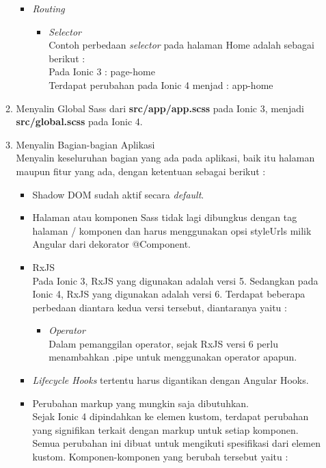\begin{enumerate}
\begin{enumerate}
\begin{itemize}
			\item {\it Routing}
			\begin{itemize}
				\item {\it Selector} \\
				Contoh perbedaan {\it selector} pada halaman Home adalah sebagai berikut :\\
				Pada Ionic 3 : page-home  \\
				Terdapat perubahan pada Ionic 4 menjad : app-home
			\end{itemize}

			
		\end{itemize}
		

		\item Menyalin Global Sass dari \textbf{src/app/app.scss} pada Ionic 3, menjadi \textbf{src/global.scss} pada Ionic 4.

		\item Menyalin Bagian-bagian Aplikasi \\
		Menyalin keseluruhan bagian yang ada pada aplikasi, baik itu halaman maupun fitur yang ada, dengan ketentuan sebagai berikut :

		\begin{itemize}
			\item Shadow DOM sudah aktif secara {\it default}.
			\item Halaman atau komponen Sass tidak lagi dibungkus dengan tag halaman / komponen dan harus menggunakan opsi styleUrls milik Angular dari dekorator @Component.
			\item RxJS \\
			Pada Ionic 3, RxJS yang digunakan adalah versi 5. Sedangkan pada Ionic 4, RxJS yang digunakan adalah versi 6. Terdapat beberapa perbedaan diantara kedua versi tersebut, diantaranya yaitu :
			\begin{itemize}
				\item {\it Operator} \\
				Dalam pemanggilan operator, sejak RxJS versi 6 perlu menambahkan .pipe untuk menggunakan operator apapun.
			\end{itemize}


			\item {\it Lifecycle Hooks} tertentu harus digantikan dengan Angular Hooks.
			\item Perubahan markup yang mungkin saja dibutuhkan. \\
			Sejak Ionic 4 dipindahkan ke elemen kustom, terdapat perubahan yang signifikan terkait dengan markup untuk setiap komponen. Semua perubahan ini dibuat untuk mengikuti spesifikasi dari elemen kustom. Komponen-komponen yang berubah tersebut yaitu :


\end{itemize}
\end{enumerate}
\end{enumerate}

